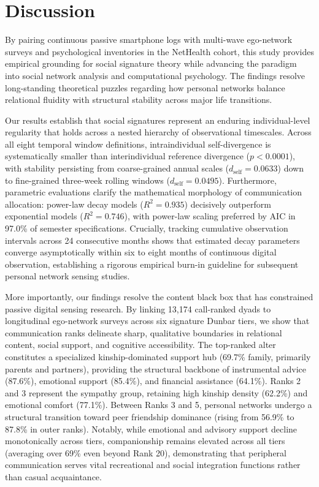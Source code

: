 \documentclass[11pt,letterpaper]{article}
\newcommand{\dself}{d_{\mathrm{self}}}
\begin{document}
\section*{Discussion}

By pairing continuous passive smartphone logs with multi-wave ego-network surveys and psychological inventories in the NetHealth cohort, this study provides empirical grounding for social signature theory while advancing the paradigm into social network analysis and computational psychology. The findings resolve long-standing theoretical puzzles regarding how personal networks balance relational fluidity with structural stability across major life transitions.

Our results establish that social signatures represent an enduring individual-level regularity that holds across a nested hierarchy of observational timescales. Across all eight temporal window definitions, intraindividual self-divergence is systematically smaller than interindividual reference divergence ($p < 0.0001$), with stability persisting from coarse-grained annual scales ($\dself = 0.0633$) down to fine-grained three-week rolling windows ($\dself = 0.0495$). Furthermore, parametric evaluations clarify the mathematical morphology of communication allocation: power-law decay models ($R^2 = 0.935$) decisively outperform exponential models ($R^2 = 0.746$), with power-law scaling preferred by AIC in 97.0\% of semester specifications. Crucially, tracking cumulative observation intervals across 24 consecutive months shows that estimated decay parameters converge asymptotically within six to eight months of continuous digital observation, establishing a rigorous empirical burn-in guideline for subsequent personal network sensing studies.

More importantly, our findings resolve the content black box that has constrained passive digital sensing research. By linking 13,174 call-ranked dyads to longitudinal ego-network surveys across six signature Dunbar tiers, we show that communication ranks delineate sharp, qualitative boundaries in relational content, social support, and cognitive accessibility. The top-ranked alter constitutes a specialized kinship-dominated support hub (69.7\% family, primarily parents and partners), providing the structural backbone of instrumental advice (87.6\%), emotional support (85.4\%), and financial assistance (64.1\%). Ranks 2 and 3 represent the sympathy group, retaining high kinship density (62.2\%) and emotional comfort (77.1\%). Between Ranks 3 and 5, personal networks undergo a structural transition toward peer friendship dominance (rising from 56.9\% to 87.8\% in outer ranks). Notably, while emotional and advisory support decline monotonically across tiers, companionship remains elevated across all tiers (averaging over 69\% even beyond Rank 20), demonstrating that peripheral communication serves vital recreational and social integration functions rather than casual acquaintance.
\end{document}
